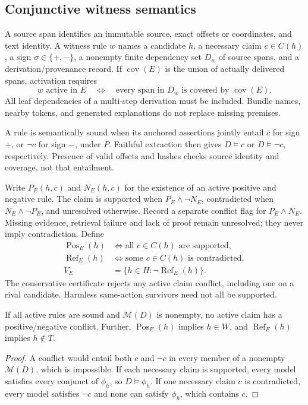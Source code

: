 \subsection{Conjunctive witness semantics}

A source span identifies an immutable source, exact offsets or coordinates,
and text identity. A witness rule $w$ names a candidate $h$, a necessary claim
$c\in C(h)$, a sign $\sigma\in\{+,-\}$, a nonempty finite dependency set
$D_w$ of source spans, and a derivation/provenance record. If $\operatorname{cov}(E)$
is the union of actually delivered spans, activation requires
\begin{equation}
 w\text{ active in }E
 \quad\Longleftrightarrow\quad
 \text{every span in }D_w\text{ is covered by }\operatorname{cov}(E).
 \label{eq:conjunctive-activation}
\end{equation}
All leaf dependencies of a multi-step derivation must be included. Bundle names,
nearby tokens, and generated explanations do not replace missing premises.

A rule is semantically sound when its anchored assertions jointly entail $c$
for sign $+$, or $\neg c$ for sign $-$, under $P$. Faithful extraction then gives
$D\models c$ or $D\models\neg c$, respectively. Presence of valid offsets and
hashes checks source identity and coverage, not that entailment.

Write $P_E(h,c)$ and $N_E(h,c)$ for the existence of an active positive and
negative rule. The claim is supported when $P_E\land\neg N_E$, contradicted
when $N_E\land\neg P_E$, and unresolved otherwise. Record a separate conflict
flag for $P_E\land N_E$. Missing evidence, retrieval failure and lack of proof
remain unresolved; they never imply contradiction. Define
\begin{align}
 \operatorname{Pos}_E(h)
 &\Longleftrightarrow \text{all }c\in C(h)\text{ are supported},\\
 \operatorname{Ref}_E(h)
 &\Longleftrightarrow \text{some }c\in C(h)\text{ is contradicted},\\
 V_E&=\{h\in H:\neg\operatorname{Ref}_E(h)\}.
\end{align}
The conservative certificate rejects any active claim conflict, including one
on a rival candidate. Harmless same-action survivors need not all be supported.

\begin{lemma}
\label{lem:local-soundness}
If all active rules are sound and $\mathcal M(D)$ is nonempty, no active claim
has a positive/negative conflict. Further,
$\operatorname{Pos}_E(h)$ implies $h\in W$, and
$\operatorname{Ref}_E(h)$ implies $h\notin T$.
\end{lemma}
\begin{proof}
A conflict would entail both $c$ and $\neg c$ in every member of a nonempty
$\mathcal M(D)$, which is impossible. If each necessary claim is supported,
every model satisfies every conjunct of $\phi_h$, so $D\models\phi_h$. If one
necessary claim $c$ is contradicted, every model satisfies $\neg c$ and none
can satisfy $\phi_h$, which contains $c$.
\end{proof}

